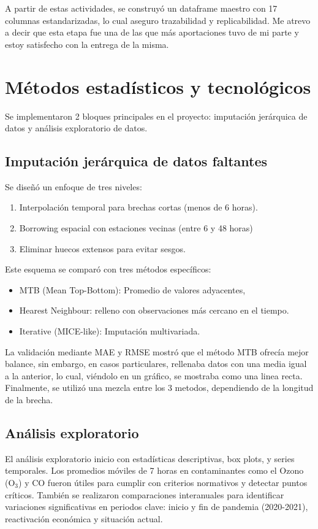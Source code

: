 \documentclass[11pt]{article}
\begin{document}
    A partir de estas actividades, se construyó un dataframe maestro con 17 columnas estandarizadas, lo cual aseguro trazabilidad y replicabilidad.
    Me atrevo a decir que esta etapa fue una de las que más aportaciones tuvo de mi parte y estoy satisfecho con la entrega de la misma.

    \section*{Métodos estadísticos y tecnológicos}

    Se implementaron 2 bloques principales en el proyecto: imputación jerárquica de datos y análisis exploratorio de datos.

    \subsection*{Imputación jerárquica de datos faltantes}

    Se diseñó un enfoque de tres niveles:
    \begin{enumerate}
        \item Interpolación temporal para brechas cortas (menos de 6 horas).
        \item Borrowing espacial con estaciones vecinas (entre 6 y 48 horas)
        \item Eliminar huecos extensos para evitar sesgos.
    \end{enumerate}

    Este esquema se comparó con tres métodos específicos:
    \begin{itemize}
        \item MTB (Mean Top-Bottom): Promedio de valores adyacentes,
        \item Hearest Neighbour: relleno con observaciones más cercano en el tiempo.
        \item Iterative (MICE-like): Imputación multivariada.
    \end{itemize}

    La validación mediante MAE y RMSE mostró que el método MTB ofrecía mejor balance, sin embargo, en casos particulares, rellenaba datos con una media igual a la anterior, lo cual, viéndolo en un gráfico, se mostraba como una linea recta.
    Finalmente, se utilizó una mezcla entre los 3 metodos, dependiendo de la longitud de la brecha.

    \subsection*{Análisis exploratorio}
    El análisis exploratorio inicio con estadísticas descriptivas, box plots, y series temporales.
    Los promedios móviles de 7 horas en contaminantes como el Ozono (O$_3$) y CO fueron útiles para cumplir con criterios normativos y detectar puntos críticos.
    También se realizaron comparaciones interanuales para identificar variaciones significativas en periodos clave: inicio y fin de pandemia (2020-2021), reactivación económica y situación actual.
\end{document}
